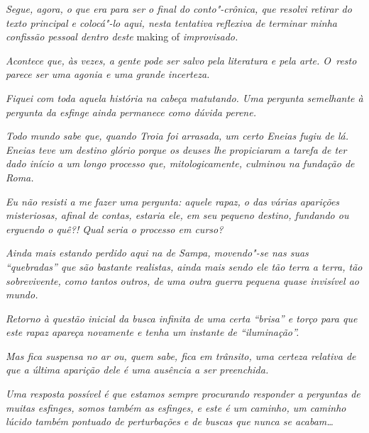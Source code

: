 \emph{\asterisc{}}

\emph{Segue, agora, o que era para ser o final do conto"-crônica, que
resolvi retirar do texto principal e colocá"-lo aqui, nesta tentativa
reflexiva de terminar minha confissão pessoal dentro deste} making of
\emph{improvisado.}

\emph{Acontece que, às vezes, a gente pode ser salvo pela literatura e
pela arte. O~resto parece ser uma agonia e uma grande incerteza.}

\emph{Fiquei com toda aquela história na cabeça matutando. Uma pergunta
semelhante à pergunta da esfinge ainda permanece como dúvida perene.}

\emph{Todo mundo sabe que, quando Troia foi arrasada, um certo Eneias
fugiu de lá. Eneias teve um destino glório porque os deuses lhe
propiciaram a tarefa de ter dado início a um longo processo que,
mitologicamente, culminou na fundação de Roma.}

\emph{Eu não resisti a me fazer uma pergunta: aquele rapaz, o das várias
aparições misteriosas, afinal de contas, estaria ele, em seu pequeno
destino, fundando ou erguendo o quê?! Qual seria o processo em curso?}

\emph{Ainda mais estando perdido aqui na  de Sampa, movendo"-se nas
suas ``quebradas'' que são bastante realistas, ainda mais sendo ele tão
terra a terra, tão sobrevivente, como tantos outros, de uma outra guerra
pequena quase invisível ao mundo.}

\emph{Retorno à questão inicial da busca infinita de uma certa ``brisa''
e torço para que este rapaz apareça novamente e tenha um instante de
``iluminação''.}

\emph{Mas fica suspensa no ar ou, quem sabe, fica em trânsito, uma
certeza relativa de que a última aparição dele é uma ausência a ser
preenchida.}

\emph{Uma resposta possível é que estamos sempre procurando responder a
perguntas de muitas esfinges, somos também as esfinges, e este é um
caminho, um caminho lúcido também pontuado de perturbações e de buscas
que nunca se acabam…~}
\endgroup